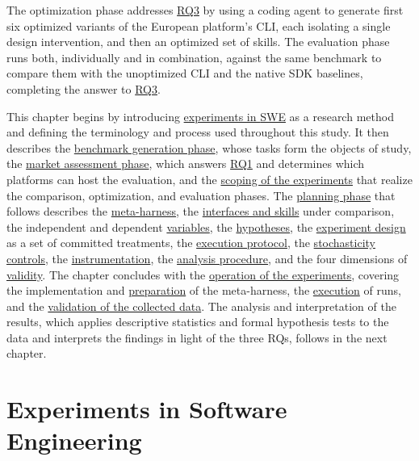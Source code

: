 \documentclass[
english,                 %
bibtex,                  %
]{kththesis}
\numberwithin{listing}{chapter}
\begin{document}
The optimization phase addresses \hyperref[rq3]{RQ3} by using a coding agent to generate first six optimized variants of the European platform's \gls{CLI}, each isolating a single design intervention, and then an optimized set of skills. The evaluation phase runs both, individually and in combination, against the same benchmark to compare them with the unoptimized \gls{CLI} and the native \gls{SDK} baselines, completing the answer to \hyperref[rq3]{RQ3}.

This chapter begins by introducing \hyperref[sec:method_experiments_in_software_engineering]{experiments in \gls{SWE}} as a research method and defining the terminology and process used throughout this study. It then describes the \hyperref[sec:method_benchmark_construction]{benchmark generation phase}, whose tasks form the objects of study, the \hyperref[sec:method_market_assessment]{market assessment phase}, which answers \hyperref[rq1]{RQ1} and determines which platforms can host the evaluation, and the \hyperref[sec:method_scoping_the_experiments]{scoping of the experiments} that realize the comparison, optimization, and evaluation phases. The \hyperref[sec:method_planning_the_experiments]{planning phase} that follows describes the \hyperref[sec:method_meta_harness]{meta-harness}, the \hyperref[sec:method_interfaces_and_skills]{interfaces and skills} under comparison, the independent and dependent \hyperref[sec:method_variables]{variables}, the \hyperref[sec:method_hypotheses]{hypotheses}, the \hyperref[sec:method_experiment_design]{experiment design} as a set of committed treatments, the \hyperref[sec:method_execution_protocol]{execution protocol}, the \hyperref[sec:method_stochasticity_controls]{stochasticity controls}, the \hyperref[sec:method_instrumentation]{instrumentation}, the \hyperref[sec:method_analysis]{analysis procedure}, and the four dimensions of \hyperref[sec:method_validity]{validity}. The chapter concludes with the \hyperref[sec:method_operating_the_experiments]{operation of the experiments}, covering the implementation and \hyperref[sec:method_preparation]{preparation} of the meta-harness, the \hyperref[sec:method_execution]{execution} of runs, and the \hyperref[sec:method_data_validation]{validation of the collected data}. The analysis and interpretation of the results, which applies descriptive statistics and formal hypothesis tests to the data and interprets the findings in light of the three \glspl{RQ}, follows in the next chapter.

\section{Experiments in Software Engineering}
\label{sec:method_experiments_in_software_engineering}
\glsresetall
\end{document}
